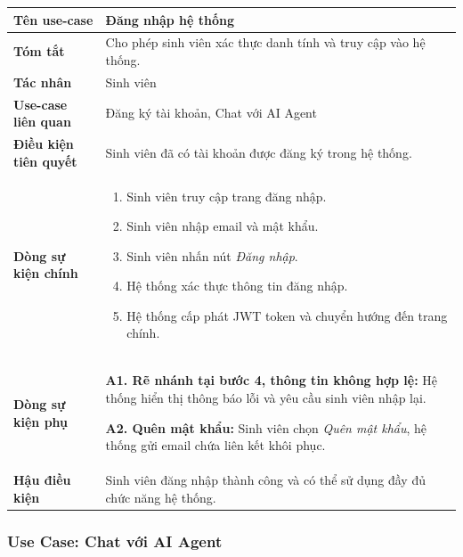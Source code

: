 \begin{longtable}{|>{\raggedright\arraybackslash}p{4.2cm}|>{\raggedright\arraybackslash}p{9.8cm}|}
	\hline
	\textbf{Tên use-case} & Đăng nhập hệ thống \\ \hline
	\textbf{Tóm tắt} & Cho phép sinh viên xác thực danh tính và truy cập vào hệ thống. \\ \hline
	\textbf{Tác nhân} & Sinh viên \\ \hline
	\textbf{Use-case liên quan} & Đăng ký tài khoản, Chat với AI Agent \\ \hline
	\textbf{Điều kiện tiên quyết} & Sinh viên đã có tài khoản được đăng ký trong hệ thống. \\ \hline
	\textbf{Dòng sự kiện chính} &
	\begin{enumerate}
		\item Sinh viên truy cập trang đăng nhập.
		\item Sinh viên nhập email và mật khẩu.
		\item Sinh viên nhấn nút \textit{Đăng nhập}.
		\item Hệ thống xác thực thông tin đăng nhập.
		\item Hệ thống cấp phát JWT token và chuyển hướng đến trang chính.
	\end{enumerate} \\ \hline
	\textbf{Dòng sự kiện phụ} & \textbf{A1. Rẽ nhánh tại bước 4, thông tin không hợp lệ:} Hệ thống hiển thị thông báo lỗi và yêu cầu sinh viên nhập lại.\par\medskip
	\textbf{A2. Quên mật khẩu:} Sinh viên chọn \textit{Quên mật khẩu}, hệ thống gửi email chứa liên kết khôi phục. \\ \hline
	\textbf{Hậu điều kiện} & Sinh viên đăng nhập thành công và có thể sử dụng đầy đủ chức năng hệ thống. \\ \hline
\end{longtable}

\subsubsection{Use Case: Chat với AI Agent}
\label{sec:uc-chat-ai}

